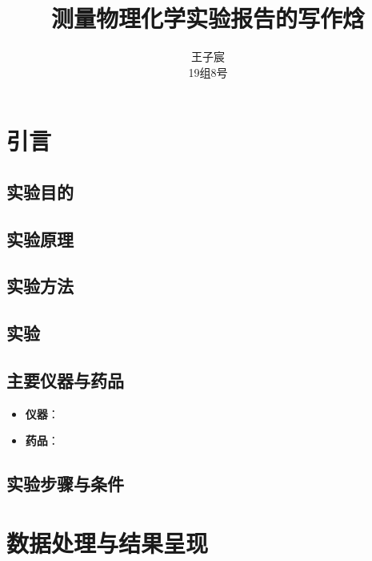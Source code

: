 \documentclass[cn,hazy,pku,12pt,normal,math=newtx,cite=super]{elegantnote}
\title{测量物理化学实验报告的写作焓}
\author{王子宸\quad210001873\\
19组\quad 8号}
\institute{化学与分子工程学院}
\begin{document}
\maketitle



\newpage


\section{引言}

\subsection{实验目的}

\subsection{实验原理}

\subsection{实验方法}


\subsection{实验}

\subsection{主要仪器与药品}

\begin{itemize}
    \item \textbf{仪器}：
    \item \textbf{药品}：
\end{itemize}
\subsection{实验步骤与条件}


\section{数据处理与结果呈现}
\end{document}
